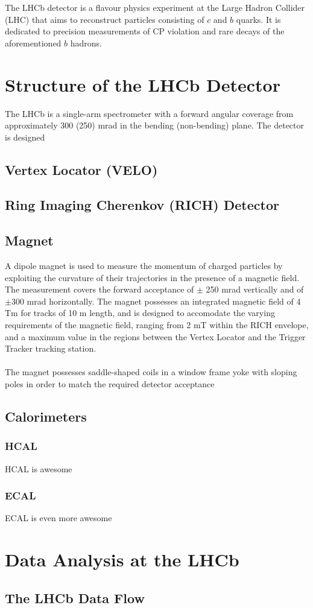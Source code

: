 The LHCb detector is a flavour physics experiment at the Large Hadron Collider (LHC) that aims to reconstruct particles 
consisting of $c$ and $b$ quarks. It is dedicated to precision measurements of CP violation and rare decays of the aforementioned $b$ 
hadrons.  
\section{Structure of the LHCb Detector}
The LHCb is a single-arm spectrometer with a forward angular coverage from approximately 300 (250) mrad in the bending (non-bending) plane. The detector is designed 
\subsection{Vertex Locator (VELO)}
\subsection{Ring Imaging Cherenkov (RICH) Detector}
\subsection{Magnet}
A dipole magnet is used to measure the momentum of charged particles by exploiting the curvature of their trajectories in the presence of a magnetic field. The measurement covers the forward acceptance of $\pm$ 250 mrad vertically and of $\pm$300 mrad horizontally. The magnet possesses an integrated magnetic field of 4 Tm for tracks of 10 m length, and is designed to accomodate the varying requirements of the magnetic field, ranging from 2 mT within the RICH envelope, and a maximum value in the regions between the Vertex Locator and the Trigger Tracker tracking station.\\
\\
The magnet possesses saddle-shaped coils in a window frame yoke with sloping poles in order to match the required detector acceptance
\subsection{Calorimeters}
\subsubsection{HCAL}
HCAL is awesome 
\subsubsection{ECAL}
ECAL is even more awesome
\section{Data Analysis at the LHCb}
\subsection{The LHCb Data Flow}


